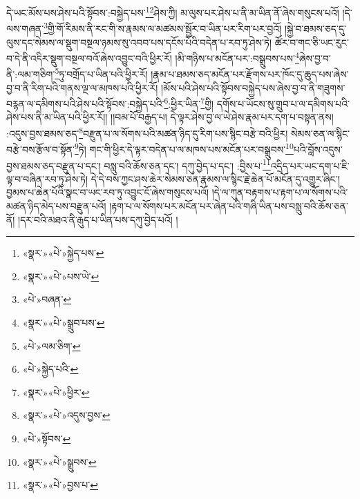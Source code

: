 དེ་ཡང་མོས་པས་ཤེས་པའི་སྟོབས་:བསྐྱེད་པས་\footnote{«སྣར་»«པེ་»སྐྱེད་པས་}\footnote{«སྣར་»«པེ་»པས་ཡེ་}ཤེས་ཀྱི། མ་ལུས་པར་ཤེས་པ་ནི་མ་ཡིན་ནོ་ཞེས་གསུངས་པའོ། །དེ་ལས་གཞན་\footnote{«པེ་»བཞན་}གྱི་གོ་རིམས་ནི་རང་གི་ས་རྣམས་ལ་མཚམས་སྦྱོར་བ་ཡིན་པར་རིག་པར་བྱའོ། །སྐྱེ་བ་ཐམས་ཅད་དུ་ལུས་དང་སེམས་ལ་སྡུག་བསྔལ་ཉམས་སུ་འབབ་པས་དངོས་པོའི་བདེན་པ་རབ་ཏུ་ཤེས་ཏེ། ཚོར་བ་གང་ཅི་ཡང་རུང་བ་དེ་ནི་འདིར་སྡུག་བསྔལ་བའོ་ཞེས་འབྱུང་བའི་ཕྱིར་རོ། །མི་གཉིས་པ་མངོན་པར་:བསྒྲུབས་པས་\footnote{«སྣར་»«པེ་»སྒྲུབ་པས་}ཞེས་བྱ་བ་ནི་:ལམ་གཅིག་\footnote{«པེ་»ལམ་ཅིག་}ཏུ་བགྲོད་པ་ཡིན་པའི་ཕྱིར་རོ། །རྣམ་པ་ཐམས་ཅད་མངོན་པར་རྫོགས་པར་ཁོང་དུ་ཆུད་པས་ཞེས་བྱ་བ་ནི་རིག་པའི་གནས་ལྔ་ལ་མཁས་པའི་ཕྱིར་རོ། །མོས་པའི་ཤེས་པའི་སྟོབས་བསྐྱེད་པས་ཞེས་བྱ་བ་ནི་གཟུགས་བརྙན་ལ་དམིགས་པའི་ཤེས་པའི་སྟོབས་:བསྐྱེད་པའི་\footnote{«པེ་»སྐྱེད་པའི་}:ཕྱིར་ཡིན་\footnote{«སྣར་»«པེ་»ཕྱིར་}གྱི། དགོས་པ་ཡོངས་སུ་གྲུབ་པ་ལ་དམིགས་པའི་ཤེས་པས་ནི་མ་ཡིན་པའི་ཕྱིར་རོ།། །།བམ་པོ་བརྒྱད་པ། དེ་ལྟར་ཤེས་བྱ་ལ་ཡེ་ཤེས་རྣམ་པར་དག་པ་བསྟན་ནས། :འདུས་བྱས་ཐམས་ཅད་\footnote{«སྣར་»«པེ་»འདུས་བྱས་}བརྫུན་པ་ལ་སོགས་པའི་མཚན་ཉིད་དུ་རིག་པས་སྙིང་བརྩེ་བའི་ཕྱིར། སེམས་ཅན་ལ་སྙིང་བརྩེ་བས་རྩོལ་བ་སྟོན་\footnote{«པེ་»སྟོབས་}ཏེ། གང་གི་ཕྱིར་དེ་ལྟར་བདེན་པ་ལ་མཁས་པས་མངོན་པར་བསྒྲུབས་\footnote{«སྣར་»«པེ་»སྒྲུབས་}པའི་བློས་འདུས་བྱས་ཐམས་ཅད་བརྫུན་པ་དང་། བསླུ་བའི་ཆོས་ཅན་དང་། དཀུ་བྱེད་པ་དང་། :བྱིས་པ་\footnote{«སྣར་»«པེ་»བྱས་པ་}འདྲིད་པར་ཡང་དག་པ་ཇི་ལྟ་བ་བཞིན་རབ་ཏུ་ཤེས་ཏེ། དེ་དེ་བས་ཀྱང་ཤས་ཆེར་སེམས་ཅན་རྣམས་ལ་སྙིང་རྗེ་ཆེན་པོ་མངོན་དུ་འགྱུར་ཞིང་། བྱམས་པ་ཆེན་པོའི་སྣང་བ་ཡང་རབ་ཏུ་འབྱུང་ངོ་ཞེས་གསུངས་པའོ། །དེ་ལ་ཀུན་བརྟགས་པ་རྟག་པ་ལ་སོགས་པའི་མཚན་ཉིད་མེད་པས་བརྫུན་པའོ། །རྟག་པ་ལ་སོགས་པར་མངོན་པར་ཞེན་པའི་གཞི་ཡིན་པས་བསླུ་བའི་ཆོས་ཅན་ནོ། །དར་བའི་མཐའ་ནི་རྒུད་པ་ཡིན་པས་དཀུ་བྱེད་པའོ། །
